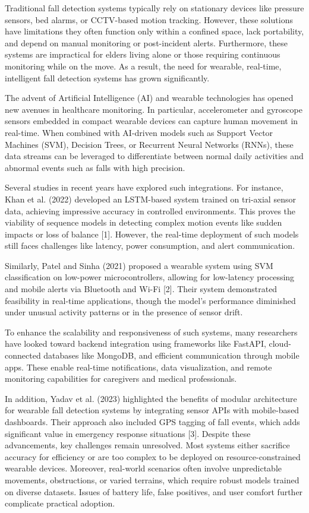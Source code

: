 \documentclass[a4paper, 12pt]{report}
\begin{document}
Traditional fall detection systems typically rely on stationary devices like pressure sensors, bed alarms, or CCTV-based motion tracking. However, these solutions have limitations they often function only within a confined space, lack portability, and depend on manual monitoring or post-incident alerts. Furthermore, these systems are impractical for elders living alone or those requiring continuous monitoring while on the move. As a result, the need for wearable, real-time, intelligent fall detection systems has grown significantly.

The advent of Artificial Intelligence (AI) and wearable technologies has opened new avenues in healthcare monitoring. In particular, accelerometer and gyroscope sensors embedded in compact wearable devices can capture human movement in real-time. When combined with AI-driven models such as Support Vector Machines (SVM), Decision Trees, or Recurrent Neural Networks (RNNs), these data streams can be leveraged to differentiate between normal daily activities and abnormal events such as falls with high precision.

Several studies in recent years have explored such integrations. For instance, Khan et al. (2022) developed an LSTM-based system trained on tri-axial sensor data, achieving impressive accuracy in controlled environments. This proves the viability of sequence models in detecting complex motion events like sudden impacts or loss of balance [1]. However, the real-time deployment of such models still faces challenges like latency, power consumption, and alert communication.

Similarly, Patel and Sinha (2021) proposed a wearable system using SVM classification on low-power microcontrollers, allowing for low-latency processing and mobile alerts via Bluetooth and Wi-Fi [2]. Their system demonstrated feasibility in real-time applications, though the model's performance diminished under unusual activity patterns or in the presence of sensor drift.

To enhance the scalability and responsiveness of such systems, many researchers have looked toward backend integration using frameworks like FastAPI, cloud-connected databases like MongoDB, and efficient communication through mobile apps. These enable real-time notifications, data visualization, and remote monitoring capabilities for caregivers and medical professionals.

In addition, Yadav et al. (2023) highlighted the benefits of modular architecture for wearable fall detection systems by integrating sensor APIs with mobile-based dashboards. Their approach also included GPS tagging of fall events, which adds significant value in emergency response situations [3].
Despite these advancements, key challenges remain unresolved. Most systems either sacrifice accuracy for efficiency or are too complex to be deployed on resource-constrained wearable devices. Moreover, real-world scenarios often involve unpredictable movements, obstructions, or varied terrains, which require robust models trained on diverse datasets. Issues of battery life, false positives, and user comfort further complicate practical adoption.
\end{document}
